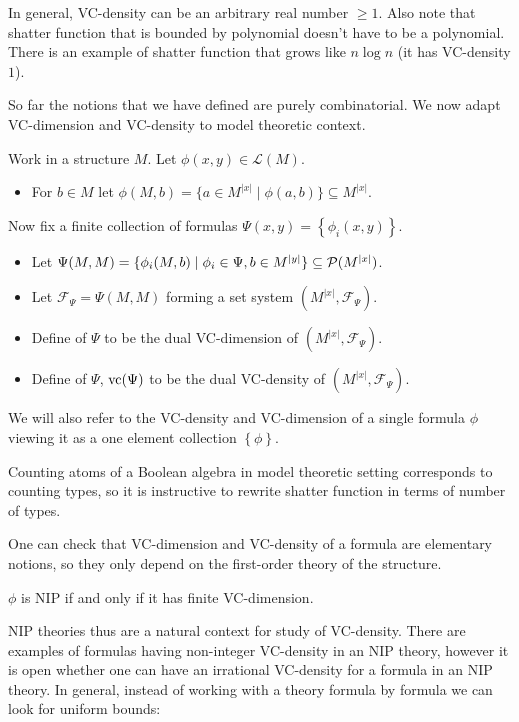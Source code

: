 \documentclass{amsart}
\newcommand{\F}{\mathcal F}
\renewcommand{\LL}{\mathcal L}
\newcommand{\curly}[1]{\left\{#1\right\}}
\begin{document}
In general, VC-density can be an arbitrary real number $\geq 1$.
Also note that shatter function that is bounded by polynomial doesn't have to be a polynomial.
There is an example of shatter function that grows like $n \log n$ (it has VC-density $1$).

So far the notions that we have defined are purely combinatorial.
We now adapt VC-dimension and VC-density to model theoretic context.

\begin{Definition}
  Work in a structure $M$.
  Let $\phi(x, y) \in \LL(M)$.

  \begin{itemize}
  \item For $b \in M$ let $\phi(M, b) = \{a \in M^{|x|} \mid \phi(a, b)\} \subseteq M^{|x|}$.
  \end{itemize}

  Now fix a finite collection of formulas $\Psi(x, y) = \curly{\phi_i(x, y)}$.

  \begin{itemize}
  \item Let $\Psi(M, M)= \{\phi_i(M, b) \mid \phi_i \in \Psi, b \in M^{|y|}\} \subseteq \mathcal P(M^{|x|})$.
  \item Let $\F_\Psi = \Psi(M, M)$ forming a set system $(M^{|x|}, \F_\Psi)$.
  \item Define  of $\Psi$ to be the dual VC-dimension of $(M^{|x|}, \F_\Psi)$.
  \item Define  of $\Psi$, $\operatorname{vc}(\Psi)$ to be the dual VC-density of $(M^{|x|}, \F_\Psi)$.
  \end{itemize}

  We will also refer to the VC-density and VC-dimension of a single formula $\phi$
  viewing it as a one element collection $\curly{\phi}$.
\end{Definition}

Counting atoms of a Boolean algebra in model theoretic setting corresponds to counting types,
so it is instructive to rewrite shatter function in terms of number of types.

One can check that VC-dimension and VC-density of a formula are elementary notions,
so they only depend on the first-order theory of the structure.

\begin{Lemma}
    $\phi$ is NIP if and only if it has finite VC-dimension. 
\end{Lemma}

NIP theories thus are a natural context for study of VC-density.
There are examples of formulas having non-integer VC-density in an NIP theory,
however it is open whether one can have an irrational VC-density for a formula in an NIP theory.
In general, instead of working with a theory formula by formula we can look for uniform bounds:
\end{document}
